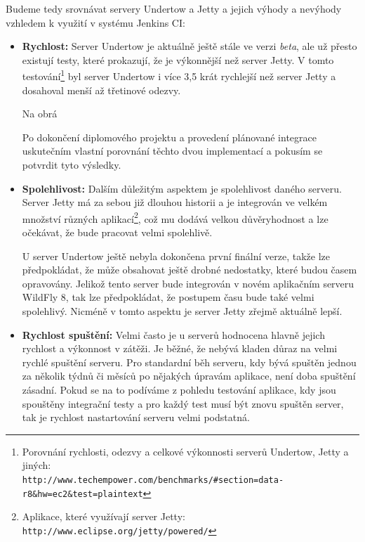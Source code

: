             \medskip
            Budeme tedy srovnávat servery Undertow a Jetty a jejich výhody a nevýhody
            vzhledem k využití v systému Jenkins CI:
            \begin{itemize}
                \item {\textbf{Rychlost:} Server Undertow je aktuálně ještě stále ve verzi \emph{beta}, ale už přesto existují
                    testy, které prokazují, že je výkonnější než server Jetty. V tomto           
                    testování\footnote{Porovnání rychlosti, odezvy a celkové výkonnosti serverů Undertow, Jetty a jiných: 
                    \\\texttt{http://www.techempower.com/benchmarks/\#section=data-r8\&hw=ec2\&test=plaintext}}
                    byl server Undertow i více 3,5 krát rychlejší než server Jetty a dosahoval menší
                    až třetinové odezvy.
            
            Na obrá
        
                    Po dokončení diplomového projektu a provedení plánované
                    integrace uskutečním vlastní porovnání těchto dvou implementací a pokusím se potvrdit
                    tyto výsledky.}

                \item{\textbf{Spolehlivost:} Dalším důležitým aspektem je spolehlivost daného serveru. 
                        Server Jetty má za sebou již dlouhou historii a je integrován ve velkém množství
                        různých aplikací\footnote{Aplikace, které využívají server Jetty: \texttt{http://www.eclipse.org/jetty/powered/}},
                        což mu dodává velkou důvěryhodnost a lze očekávat, že bude pracovat velmi 
                        spolehlivě. 
                        
                        U server Undertow ještě nebyla dokončena první finální verze,
                        takže lze předpokládat, že může obsahovat ještě drobné nedostatky,
                        které budou časem opravovány. Jelikož tento server bude integrován
                        v novém aplikačním serveru WildFly 8, tak lze předpokládat,
                        že postupem času bude také velmi spolehlivý. 
                        Nicméně v tomto aspektu je server Jetty zřejmě 
                        aktuálně lepší.}

                \item{\textbf{Rychlost spuštění:}  Velmi často je u serverů hodnocena hlavně
                    jejich rychlost a výkonnost v zátěži. Je běžné, že nebývá kladen důraz na
                    velmi rychlé spuštění serveru. Pro standardní běh serveru, kdy bývá 
                    spuštěn jednou za několik týdnů či měsíců po nějakých úpravám aplikace,
                    není doba spuštění zásadní. Pokud se na to podíváme z pohledu testování
                    aplikace, kdy jsou spouštěny integrační testy a pro každý test musí být
                    znovu spuštěn server, tak je rychlost nastartování serveru velmi podstatná.
                    
}
\end{itemize}
